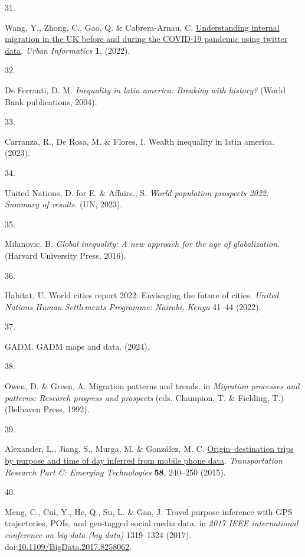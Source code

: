 \documentclass[
  11pt,
]{article}
\newlength{\cslhangindent}
\newlength{\csllabelwidth}
\newenvironment{CSLReferences}[2] %
 {\begin{list}{}{%
  \setlength{\itemindent}{0pt}
  \setlength{\leftmargin}{0pt}
  \setlength{\parsep}{0pt}
  \ifodd #1
   \setlength{\leftmargin}{\cslhangindent}
   \setlength{\itemindent}{-1\cslhangindent}
  \fi
  \setlength{\itemsep}{#2\baselineskip}}}
 {\end{list}}
\newcommand{\CSLLeftMargin}[1]{\parbox[t]{\csllabelwidth}{\strut#1\strut}}
\newcommand{\CSLRightInline}[1]{\parbox[t]{\linewidth - \csllabelwidth}{\strut#1\strut}}
\begin{document}
\begin{CSLReferences}{0}{0}
\CSLLeftMargin{31. }%
\CSLRightInline{Wang, Y., Zhong, C., Gao, Q. \& Cabrera-Arnau, C.
\href{https://doi.org/10.1007/s44212-022-00018-w}{Understanding internal
migration in the UK before and during the COVID-19 pandemic using
twitter data}. \emph{Urban Informatics} \textbf{1}, (2022).}

\CSLLeftMargin{32. }%
\CSLRightInline{De Ferranti, D. M. \emph{Inequality in latin america:
Breaking with history?} (World Bank publications, 2004).}

\CSLLeftMargin{33. }%
\CSLRightInline{Carranza, R., De Rosa, M. \& Flores, I. Wealth
inequality in latin america. (2023).}

\CSLLeftMargin{34. }%
\CSLRightInline{United Nations, D. for E. \& Affairs., S. \emph{World
population prospects 2022: Summary of results}. (UN, 2023).}

\CSLLeftMargin{35. }%
\CSLRightInline{Milanovic, B. \emph{Global inequality: A new approach
for the age of globalization}. (Harvard University Press, 2016).}

\CSLLeftMargin{36. }%
\CSLRightInline{Habitat, U. World cities report 2022: Envisaging the
future of cities. \emph{United Nations Human Settlements Programme:
Nairobi, Kenya} 41--44 (2022).}

\CSLLeftMargin{37. }%
\CSLRightInline{GADM. GADM maps and data. (2024).}

\CSLLeftMargin{38. }%
\CSLRightInline{Owen, D. \& Green, A. Migration patterns and trends. in
\emph{Migration processes and patterns: Research progress and prospects}
(eds. Champion, T. \& Fielding, T.) (Belhaven Press, 1992).}

\CSLLeftMargin{39. }%
\CSLRightInline{Alexander, L., Jiang, S., Murga, M. \& González, M. C.
\href{https://doi.org/10.1016/j.trc.2015.02.018}{Origin--destination
trips by purpose and time of day inferred from mobile phone data}.
\emph{Transportation Research Part C: Emerging Technologies}
\textbf{58}, 240--250 (2015).}

\CSLLeftMargin{40. }%
\CSLRightInline{Meng, C., Cui, Y., He, Q., Su, L. \& Gao, J. Travel
purpose inference with GPS trajectories, POIs, and geo-tagged social
media data. in \emph{2017 IEEE international conference on big data (big
data)} 1319--1324 (2017).
doi:\href{https://doi.org/10.1109/BigData.2017.8258062}{10.1109/BigData.2017.8258062}.}


\end{CSLReferences}
\end{document}
